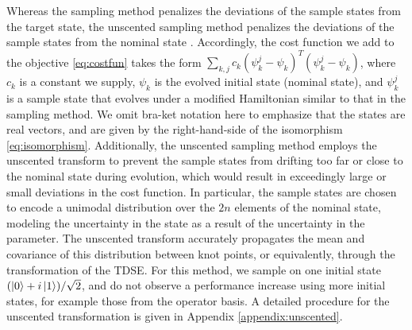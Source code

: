 Whereas the sampling method penalizes the deviations of the sample states
from the target state, the unscented sampling method
penalizes the deviations of the sample states from the nominal state
\cite{howell2020direct, lee2013sigma,
  thangavel2020robust}. Accordingly, the cost function we add
to the objective \eqref{eq:costfun} takes the form
$\sum_{k, j} c_{k} (\psi^{j}_{k} - \psi_{k})^{T}
(\psi^{j}_{k} - \psi_{k})$, where $c_{k}$ is a
constant we supply, $\psi_{k}$ is
the evolved initial state (nominal state), and $\psi^{j}_{k}$ is a sample state
that evolves under a modified Hamiltonian similar to that in the sampling method.
We omit bra-ket notation here to emphasize that
the states are real vectors, and are given by the right-hand-side of the
isomorphism \eqref{eq:isomorphism}. Additionally,
the unscented sampling method employs the unscented transform
\cite{julier2004unscented, uhlmann1995dynamic}
to prevent the sample states
from drifting too far or close to the nominal state during evolution,
which would result in exceedingly large or small deviations in the cost function.
In particular, the sample states are chosen to encode a unimodal distribution over
the $2n$  elements of the nominal state, modeling the uncertainty in the state
as a result of the uncertainty in the parameter. The unscented transform
accurately propagates the mean and covariance of this distribution between
knot points, or equivalently, through the transformation of the TDSE.
For this method, we sample on one initial state $(\ket{0} + i\ket{1}) / \sqrt{2}$,
and do not observe a performance increase
using more initial states, for example those from the operator basis.
A detailed procedure for the unscented transformation is given
in Appendix \ref{appendix:unscented}.

